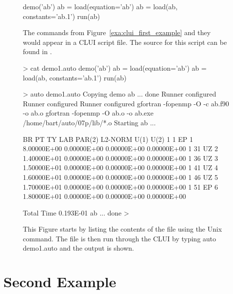 \documentclass[12pt]{report}
\begin{document}
 \begin{figure}[htb]
 {\small \begin{center} \begin{boxedverbatim}
 demo('ab')
 ab = load(equation='ab')
 ab = load(ab, constants='ab.1')
 run(ab)
 \end{boxedverbatim}
 \end{center} 
 }
 \caption[First example of a \AUTO CLUI script.]
 {The commands from Figure~\ref{exa:clui_first_example}
 and they would appear in a \AUTO CLUI script file.
 The source for this script can be found in .
 }
 \label{exa:clui_first_script}
 \end{figure}

 \begin{figure}[htb]
 {\small \begin{center} \begin{boxedverbatim}
 > cat demo1.auto
 demo('ab')
 ab = load(equation='ab')
 ab = load(ab, constants='ab.1')
 run(ab)

 > auto demo1.auto 
 Copying demo ab ... done
 Runner configured
 Runner configured
 Runner configured
 gfortran -fopenmp -O -c ab.f90 -o ab.o
 gfortran -fopenmp -O ab.o -o ab.exe /home/bart/auto/07p/lib/*.o
 Starting ab ...

   BR    PT  TY  LAB    PAR(2)        L2-NORM         U(1)          U(2)     
    1     1  EP    1   8.00000E+00   0.00000E+00   0.00000E+00   0.00000E+00
    1    31  UZ    2   1.40000E+01   0.00000E+00   0.00000E+00   0.00000E+00
    1    36  UZ    3   1.50000E+01   0.00000E+00   0.00000E+00   0.00000E+00
    1    41  UZ    4   1.60000E+01   0.00000E+00   0.00000E+00   0.00000E+00
    1    46  UZ    5   1.70000E+01   0.00000E+00   0.00000E+00   0.00000E+00
    1    51  EP    6   1.80000E+01   0.00000E+00   0.00000E+00   0.00000E+00

  Total Time    0.193E-01
 ab ... done
 > 
 \end{boxedverbatim}
 \end{center} 
 }
 \caption[Figure of running a simple \AUTO CLUI script.]
 {This Figure starts by listing the contents
 of the  file using the Unix
  command.  The file is then run through
 the \AUTO CLUI by typing {auto demo1.auto} 
 and the output is shown.}
 \label{exa:clui_run_first_script}
 \end{figure}


 \section{ Second Example } \label{sec:clui_complex_example}
\end{document}
